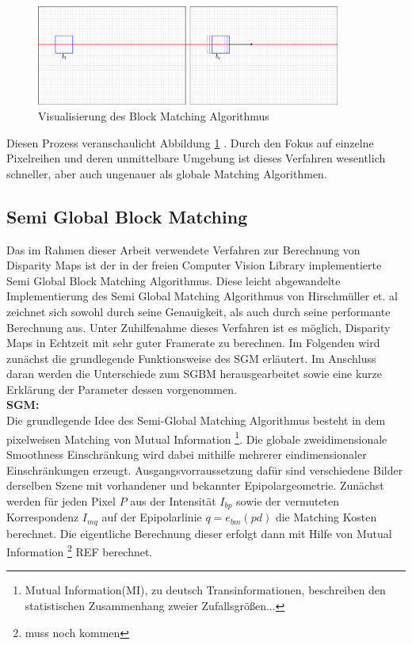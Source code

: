 \begin{figure}
	\begin{center}
		\includegraphics[width=10cm]{img/block_matching.pdf}
	\end{center}
	\caption{Visualisierung des Block Matching Algorithmus}
	\label{fig:block_matching}
\end{figure}

\noindent
Diesen Prozess veranschaulicht Abbildung \ref{fig:block_matching} . Durch den Fokus auf einzelne Pixelreihen und deren unmittelbare Umgebung ist dieses Verfahren wesentlich schneller, aber auch ungenauer als globale Matching Algorithmen. 
 


\subsection{Semi Global Block Matching}
\label{subsec:stereo_matching_sgbm}
Das im Rahmen dieser Arbeit verwendete Verfahren zur Berechnung von Disparity Maps ist der in der freien Computer Vision Library implementierte Semi Global Block Matching Algorithmus. Diese leicht abgewandelte Implementierung des Semi Global Matching Algorithmus von Hirschmüller et. al \cite{hirschmuller2005sgm} zeichnet sich sowohl durch seine Genauigkeit, als auch durch seine performante Berechnung aus. Unter Zuhilfenahme dieses Verfahren ist es möglich, Disparity Maps in Echtzeit mit sehr guter Framerate zu berechnen. Im Folgenden wird zunächst die grundlegende Funktionsweise des SGM erläutert. Im Anschluss daran werden die Unterschiede zum SGBM herausgearbeitet sowie eine kurze Erklärung der Parameter dessen vorgenommen.\\

\noindent
\textbf{SGM:} \\
Die grundlegende Idee des Semi-Global Matching Algorithmus besteht in dem pixelweisen Matching von Mutual Information \footnote{Mutual Information(MI), zu deutsch Transinformationen, beschreiben den statistischen Zusammenhang zweier Zufallsgrößen...}. Die globale zweidimensionale Smoothness Einschränkung wird dabei mithilfe mehrerer eindimensionaler Einschränkungen erzeugt. Ausgangsvorraussetzung dafür sind verschiedene Bilder derselben Szene mit vorhandener und bekannter Epipolargeometrie. 
Zunächst werden für jeden Pixel $P$ aus der Intensität $I_{bp}$ sowie der vermuteten Korrespondenz $I_{mq}$ auf der Epipolarlinie $q=e_{bm}(pd)$ die Matching Kosten berechnet. Die eigentliche Berechnung dieser erfolgt dann mit Hilfe von Mutual Information \footnote{muss noch kommen} REF berechnet.

